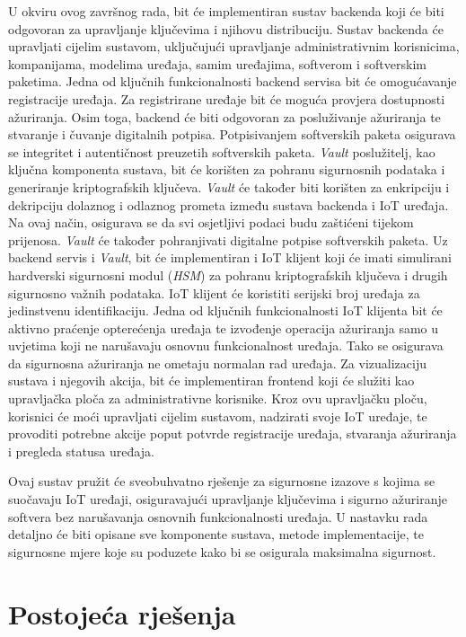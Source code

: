 \documentclass[zavrsnirad]{fer}
\begin{document}
	U okviru ovog završnog rada, bit će implementiran sustav backenda koji će biti odgovoran za upravljanje ključevima i njihovu distribuciju. Sustav backenda će upravljati cijelim sustavom, uključujući upravljanje administrativnim korisnicima, kompanijama, modelima uređaja, samim uređajima, softverom i softverskim paketima. Jedna od ključnih funkcionalnosti backend servisa bit će omogućavanje registracije uređaja. Za registrirane uređaje bit će moguća provjera dostupnosti ažuriranja. Osim toga, backend će biti odgovoran za posluživanje ažuriranja te stvaranje i čuvanje digitalnih potpisa. Potpisivanjem softverskih paketa osigurava se integritet i autentičnost preuzetih softverskih paketa.
	\textit{Vault} poslužitelj, kao ključna komponenta sustava, bit će korišten za pohranu sigurnosnih podataka i generiranje kriptografskih ključeva. \textit{Vault} će također biti korišten za enkripciju i dekripciju dolaznog i odlaznog prometa između sustava backenda i IoT uređaja. Na ovaj način, osigurava se da svi osjetljivi podaci budu zaštićeni tijekom prijenosa. \textit{Vault} će također pohranjivati digitalne potpise softverskih paketa.
	Uz backend servis i \textit{Vault}, bit će implementiran i IoT klijent koji će imati simulirani hardverski sigurnosni modul (\textit{HSM}) za pohranu kriptografskih ključeva i drugih sigurnosno važnih podataka. IoT klijent će koristiti serijski broj uređaja za jedinstvenu identifikaciju. Jedna od ključnih funkcionalnosti IoT klijenta bit će aktivno praćenje opterećenja uređaja te izvođenje operacija ažuriranja samo u uvjetima koji ne narušavaju osnovnu funkcionalnost uređaja. Tako se osigurava da sigurnosna ažuriranja ne ometaju normalan rad uređaja.
	Za vizualizaciju sustava i njegovih akcija, bit će implementiran frontend koji će služiti kao upravljačka ploča za administrativne korisnike. Kroz ovu upravljačku ploču, korisnici će moći upravljati cijelim sustavom, nadzirati svoje IoT uređaje, te provoditi potrebne akcije poput potvrde registracije uređaja, stvaranja ažuriranja i pregleda statusa uređaja.
	
	Ovaj sustav pružit će sveobuhvatno rješenje za sigurnosne izazove s kojima se suočavaju IoT uređaji, osiguravajući upravljanje ključevima i sigurno ažuriranje softvera bez narušavanja osnovnih funkcionalnosti uređaja. U nastavku rada detaljno će biti opisane sve komponente sustava, metode implementacije, te sigurnosne mjere koje su poduzete kako bi se osigurala maksimalna sigurnost.
	
	
	\chapter{Postojeća rješenja}
	\label{pog:postojeca_rjesenja}
	
\end{document}

